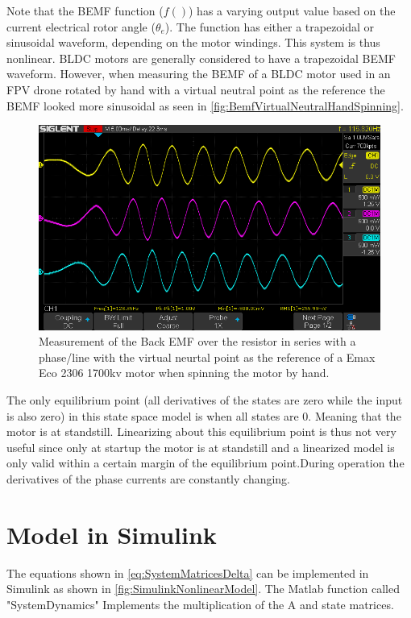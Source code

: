 \documentclass[]{report}
\begin{document}
Note that the BEMF function ($f()$) has a varying output value based on the current electrical rotor angle ($\theta_e$). The function has either a trapezoidal or sinusoidal waveform, depending on the motor windings. This system is thus nonlinear. BLDC motors are generally considered to have a trapezoidal BEMF waveform. However, when measuring the BEMF of a BLDC motor used in an FPV drone rotated by hand with a virtual neutral point as the reference the BEMF looked more sinusoidal as seen in \autoref{fig:BemfVirtualNeutralHandSpinning}.

\begin{figure}[H]
	\centering
	\includegraphics[width=\textwidth]{Scope/VirtualNeutral/BEMF_Phases_virtual_neutral.png}
	\caption{Measurement of the Back EMF over the resistor in series with a phase/line with the virtual neurtal point as the reference of a Emax Eco 2306 1700kv motor when spinning the motor by hand.}
	\label{fig:BemfVirtualNeutralHandSpinning}
\end{figure}

The only equilibrium point (all derivatives of the states are zero while the input is also zero) in this state space model is when all states are 0. Meaning that the motor is at standstill. Linearizing about this equilibrium point is thus not very useful since only at startup the motor is at standstill and a linearized model is only valid within a certain margin of the equilibrium point.During operation the derivatives of the phase currents are constantly changing.

\section{Model in Simulink}

The equations shown in \autoref{eq:SystemMatricesDelta} can be implemented in Simulink as shown in \autoref{fig:SimulinkNonlinearModel}. The Matlab function called "SystemDynamics" Implements the multiplication of the A and state matrices. 
\end{document}
